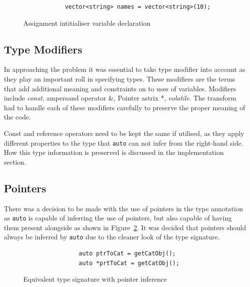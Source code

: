 \documentclass[bsc,frontabs,singlespacing,twoside,parskip,deptreport]{infthesis}
\begin{document}
\begin{figure}[!h]
    \begin{verbatim}
            vector<string> names = vector<string>(10);
    \end{verbatim}
    \caption{Assignment intitialiser variable declaration}
    \label{fig:ass-var}
\end{figure}

\subsection{Type Modifiers}
In approaching the problem it was essential to take type modifier into account as they play an important roll in specifying types. These modifiers are the terms that add additional meaning and constraints on to uses of variables. Modifiers include \textit{const}, ampersand operator \&, Pointer astrix *, \textit{volatile}. The transform had to handle each of these modifiers carefully to preserve the proper meaning of the code. 

Const and reference operators need to be kept the same if utilised, as they apply different properties to the type that \texttt{auto} can not infer from the right-hand side. How this type information is preserved is discussed in the implementation section. 

\subsection{Pointers}
There was a decision to be made with the use of pointers in the type annotation as \texttt{auto} is capable of inferring the use of pointers, but also capable of having them present alongside as shown in Figure~\ref{fig:ptr_type_inf}. It was decided that pointers should always be inferred by \texttt{auto} due to the cleaner look of the type signature. 

\begin{figure}[!h]
    \centering
    \begin{verbatim}
                auto ptrToCat = getCatObj();
                auto *prtToCat = getCatObj();
    \end{verbatim}
    \caption{Equivalent type signature with pointer inference}
    \label{fig:ptr_type_inf}
\end{figure}
\end{document}
